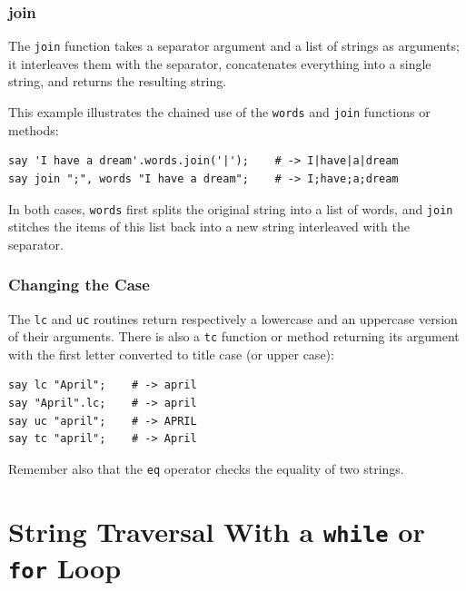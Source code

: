\subsubsection{join}

The {\tt join} function takes a separator argument and a list 
of strings as arguments; it interleaves them with the separator, 
concatenates everything into a single string, and returns the 
resulting string.

This example illustrates the chained use of the {\tt words} and 
{\tt join} functions or methods:
\begin{verbatim}
say 'I have a dream'.words.join('|');    # -> I|have|a|dream
say join ";", words "I have a dream";    # -> I;have;a;dream
\end{verbatim}
%

In both cases, {\tt words} first splits the original 
string into a list of words, and {\tt join} stitches 
the items of this list back into a new string interleaved 
with the separator.  

\subsubsection{Changing the Case}

The {\tt lc} and {\tt uc} routines return respectively a 
lowercase and an uppercase version of their arguments. 
There is also a {\tt tc} function or method returning its 
argument with the first letter converted to title case (or 
upper case):

\begin{verbatim}
say lc "April";    # -> april
say "April".lc;    # -> april
say uc "april";    # -> APRIL
say tc "april";    # -> April
\end{verbatim}

Remember also that the {\tt eq} operator checks the equality 
of two strings. 

\section{String Traversal With a {\tt while} or {\tt for} Loop}
\label{stringtraversal}

